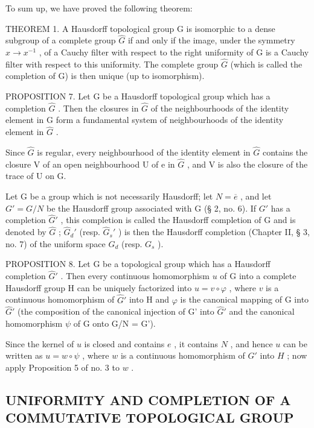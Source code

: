 To sum up, we have proved the following theorem:

THEOREM 1. A Hausdorff topological group G is isomorphic to a dense subgroup of a complete group \(\hat{G}\) if and only if the image, under the symmetry \(x \to x^{-1}\) , of a Cauchy filter with respect to the right uniformity of G is a Cauchy filter with respect to this uniformity. The complete group \(\hat{G}\) (which is called the completion of G) is then unique (up to isomorphism).

PROPOSITION 7. Let G be a Hausdorff topological group which has a completion \(\hat{G}\) . Then the closures in \(\hat{G}\) of the neighbourhoods of the identity element in G form a fundamental system of neighbourhoods of the identity element in \(\hat{G}\) .

Since \(\hat{G}\) is regular, every neighbourhood of the identity element in \(\hat{G}\) contains the closure V of an open neighbourhood U of e in \(\hat{G}\) , and V is also the closure of the trace of U on G.

Let G be a group which is not necessarily Hausdorff; let \(N = \overline{e}\) , and let \(G' = G/N\) be the Hausdorff group associated with G (§ 2, no. 6). If \(G'\) has a completion \(\hat{G}'\) , this completion is called the Hausdorff completion of G and is denoted by \(\hat{G}\) ; \(\hat{G}_{d}'\) (resp. \(\hat{G}_{s}'\) ) is then the Hausdorff completion (Chapter II, § 3, no. 7) of the uniform space \(G_{d}\) (resp. \(G_{s}\) ).

PROPOSITION 8. Let G be a topological group which has a Hausdorff completion \(\hat{G}'\) . Then every continuous homomorphism \(u\) of G into a complete Hausdorff group H can be uniquely factorized into \(u = v \circ \varphi\) , where \(v\) is a continuous homomorphism of \(\hat{G}'\) into H and \(\varphi\) is the canonical mapping of G into \(\hat{G}'\) (the composition of the canonical injection of G' into \(\hat{G}'\) and the canonical homomorphism \(\psi\) of G onto G/N = G').

Since the kernel of \(u\) is closed and contains \(e\) , it contains \(N\) , and hence \(u\) can be written as \(u = w \circ \psi\) , where \(w\) is a continuous homomorphism of \(G'\) into \(H\) ; now apply Proposition 5 of no. 3 to \(w\) .

\subsection{UNIFORMITY AND COMPLETION OF A COMMUTATIVE TOPOLOGICAL GROUP}

